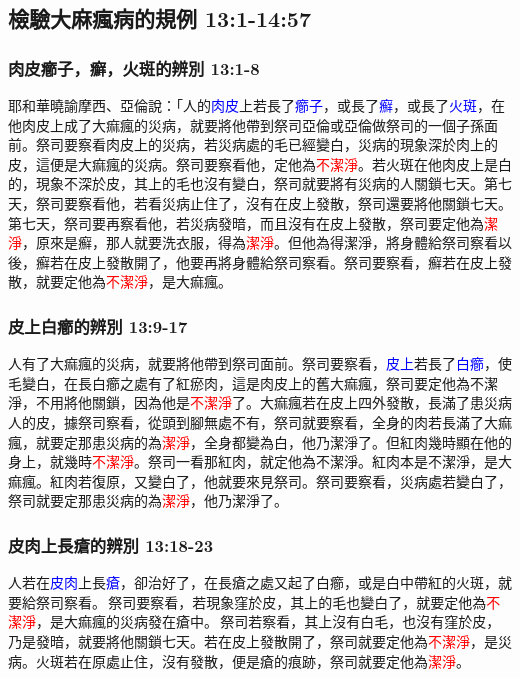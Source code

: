 \subsection{檢驗大麻瘋病的規例 13:1-14:57}



\subsubsection{肉皮癤子，癬，火斑的辨別 13:1-8}
耶和華曉諭摩西、亞倫說：「人的\textcolor{blue}{肉皮}上若長了\textcolor{blue}{癤子}，或長了\textcolor{blue}{癬}，或長了\textcolor{blue}{火斑}，在他肉皮上成了大痲瘋的災病，就要將他帶到祭司亞倫或亞倫做祭司的一個子孫面前。祭司要察看肉皮上的災病，若災病處的毛已經變白，災病的現象深於肉上的皮，這便是大痲瘋的災病。祭司要察看他，定他為\textcolor{red}{不潔淨}。若火斑在他肉皮上是白的，現象不深於皮，其上的毛也沒有變白，祭司就要將有災病的人關鎖七天。第七天，祭司要察看他，若看災病止住了，沒有在皮上發散，祭司還要將他關鎖七天。第七天，祭司要再察看他，若災病發暗，而且沒有在皮上發散，祭司要定他為\textcolor{red}{潔淨}，原來是癬，那人就要洗衣服，得為\textcolor{red}{潔淨}。但他為得潔淨，將身體給祭司察看以後，癬若在皮上發散開了，他要再將身體給祭司察看。祭司要察看，癬若在皮上發散，就要定他為\textcolor{red}{不潔淨}，是大痲瘋。

\subsubsection{皮上白癤的辨別 13:9-17}
人有了大痲瘋的災病，就要將他帶到祭司面前。祭司要察看，\textcolor{blue}{皮上}若長了\textcolor{blue}{白癤}，使毛變白，在長白癤之處有了紅瘀肉，這是肉皮上的舊大痲瘋，祭司要定他為不潔淨，不用將他關鎖，因為他是\textcolor{red}{不潔淨}了。大痲瘋若在皮上四外發散，長滿了患災病人的皮，據祭司察看，從頭到腳無處不有，祭司就要察看，全身的肉若長滿了大痲瘋，就要定那患災病的為\textcolor{red}{潔淨}，全身都變為白，他乃潔淨了。但紅肉幾時顯在他的身上，就幾時\textcolor{red}{不潔淨}。祭司一看那紅肉，就定他為不潔淨。紅肉本是不潔淨，是大痲瘋。紅肉若復原，又變白了，他就要來見祭司。祭司要察看，災病處若變白了，祭司就要定那患災病的為\textcolor{red}{潔淨}，他乃潔淨了。

\subsubsection{皮肉上長瘡的辨別 13:18-23}
人若在\textcolor{blue}{皮肉}上長\textcolor{blue}{瘡}，卻治好了，在長瘡之處又起了白癤，或是白中帶紅的火斑，就要給祭司察看。 祭司要察看，若現象窪於皮，其上的毛也變白了，就要定他為\textcolor{red}{不潔淨}，是大痲瘋的災病發在瘡中。 祭司若察看，其上沒有白毛，也沒有窪於皮，乃是發暗，就要將他關鎖七天。若在皮上發散開了，祭司就要定他為\textcolor{red}{不潔淨}，是災病。火斑若在原處止住，沒有發散，便是瘡的痕跡，祭司就要定他為\textcolor{red}{潔淨}。

